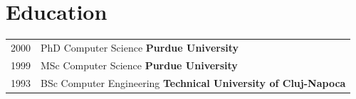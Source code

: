 \section{Education}

\begin{tabularx}{\linewidth}{@{}l X@{}}	
2000 & PhD Computer Science \hfill \textbf{Purdue University} \\
1999 & MSc Computer Science \hfill \textbf{Purdue University} \\ 
1993 & BSc Computer Engineering \hfill \textbf{Technical University of Cluj-Napoca} \\
\end{tabularx}